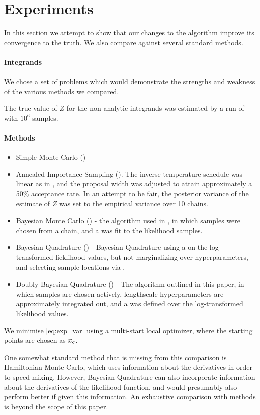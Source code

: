 \documentclass{article}
\begin{document}
\section{Experiments}
\label{sec:experiments}
In this section we attempt to show that our changes to the  algorithm improve its convergence to the truth.  We also compare against several standard  methods.
\paragraph{Integrands}
We chose a set of problems which would demonstrate the strengths and weakness of the various methods we compared.

The true value of $Z$ for the non-analytic integrands was estimated by a run of  with $10^6$ samples.
\paragraph{Methods}
\begin{itemize}
\item Simple Monte Carlo ()
\item Annealed Importance Sampling ().  The inverse temperature schedule was linear as in \citep{BZMonteCarlo}, and the proposal width was adjusted to attain approximately a 50\% acceptance rate.  In an attempt to be fair, the posterior variance of the  estimate of $Z$ was set to the empirical variance over 10 chains.
\item Bayesian Monte Carlo () - the algorithm used in \citep{BZMonteCarlo}, in which samples were chosen from a  chain, and a \gpb was fit to the likelihood samples.
\item Bayesian Quadrature () - Bayesian Quadrature using a \gpb on the log-transformed lieklihood values, but not marginalizing over hyperparameters, and selecting sample locations via .
\item Doubly Bayesian Quadrature () - The algorithm outlined in this paper, in which samples are chosen actively, lengthscale hyperparameters are approximately integrated out, and a \gpb was defined over the log-transformed likelihood values.
\end{itemize}
We minimise \eqref{eq:exp_var} using a multi-start local optimizer, where the starting points are chosen as $\lfv_c$. 

One somewhat standard method that is missing from this comparison is Hamiltonian Monte Carlo, which uses information about the derivatives in order to speed mixing.  However, Bayesian Quadrature can also incorporate information about the derivatives of the likelihood function, and would presumably also perform better if given this information.  An exhaustive comparison with  methods is beyond the scope of this paper.
\end{document}
